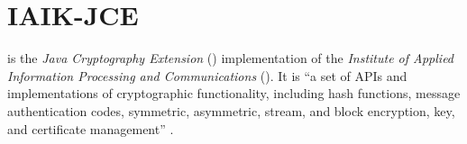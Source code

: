 \section{IAIK-JCE} \label{section:pre:jce} 


 is the \textit{Java Cryptography Extension} ()  implementation of the \textit{Institute of Applied Information Processing and Communications} (). It is ``a set of APIs and implementations of cryptographic functionality, including hash functions, message authentication codes, symmetric, asymmetric, stream, and block encryption, key, and certificate management'' \cite{IAIKJCE}.



